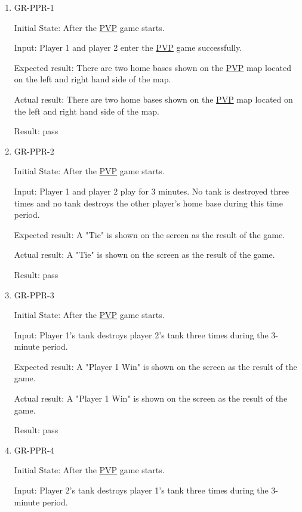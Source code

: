 \documentclass[12pt, titlepage]{article}
\begin{document}
\begin{enumerate}

\item{GR-PPR-1\\}
					
Initial State: After the \underline{PVP} game starts.
					
Input: Player 1 and player 2 enter the \underline{PVP} game successfully.
					
Expected result: There are two home bases shown on the \underline{PVP} map located on the left and right hand side of the map.
					
Actual result: There are two home bases shown on the \underline{PVP} map located on the left and right hand side of the map.

Result: pass

\item{GR-PPR-2\\}
					
Initial State: After the \underline{PVP} game starts.
					
Input: Player 1 and player 2 play for 3 minutes. No tank is destroyed three times and no tank destroys the other player's home base during this time period.
					
Expected result: A "Tie" is shown on the screen as the result of the game.
					
Actual result: A "Tie" is shown on the screen as the result of the game.

Result: pass

\item{GR-PPR-3\\}
					
Initial State: After the \underline{PVP} game starts.
					
Input: Player 1's tank destroys player 2's tank three times during the 3-minute period.
					
Expected result: A "Player 1 Win" is shown on the screen as the result of the game.
					
Actual result: A "Player 1 Win" is shown on the screen as the result of the game.

Result: pass

\item{GR-PPR-4\\}
					
Initial State: After the \underline{PVP} game starts.
					
Input: Player 2's tank destroys player 1's tank three times during the 3-minute period.
					

\end{enumerate}
\end{document}
